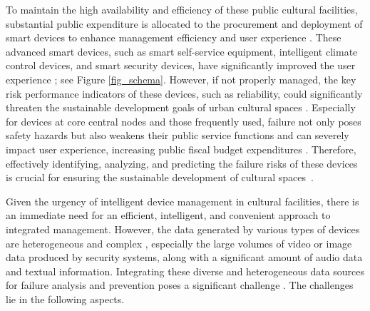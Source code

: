 \documentclass[preprint,12pt]{elsarticle}
\begin{document}
To maintain the high availability and efficiency of these public cultural facilities, substantial public expenditure is allocated to the procurement and deployment of smart devices  to enhance management efficiency and user experience \cite{florida2002rise}. These advanced smart devices, such as smart self-service equipment, intelligent climate control devices, and smart security devices, have significantly improved the user experience \cite{chianese2013smartweet}; see Figure \ref{fig_schema}. However, if not properly managed, the key risk performance indicators of these devices, such as reliability, could significantly threaten the sustainable development goals of urban cultural spaces \cite{amato2013talking}. Especially for devices at core central nodes and those frequently used, failure not only poses safety hazards but also weakens their public service functions and can severely impact user experience, increasing public fiscal budget expenditures \cite{chianese2015designing}. Therefore, effectively identifying, analyzing, and predicting the failure risks of these devices is crucial for ensuring the sustainable development of cultural spaces~\cite{ruotsalo2013smartmuseum}. 



Given the urgency of intelligent device management in cultural facilities, there is an immediate need for an efficient, intelligent, and convenient approach to integrated management. However, the data generated by various types of devices are heterogeneous and complex \cite{Shi202420769,Xu202468,hu2021distributed}, especially the large volumes of video or image data produced by security systems, along with a significant amount of audio data and textual information. Integrating these diverse and heterogeneous data sources for failure analysis and prevention poses a significant challenge \cite{Bi2023}. The challenges lie in the following aspects.
\end{document}
